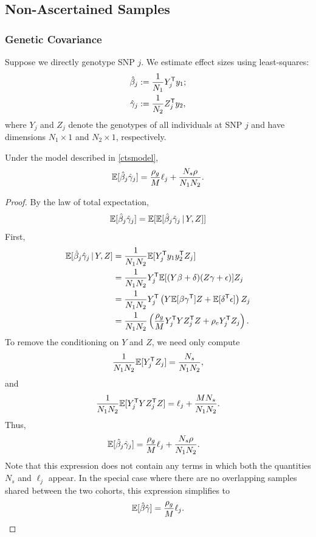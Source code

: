 \documentclass[11pt]{article}
\numberwithin{equation}{section}
\numberwithin{definition}{section}
\numberwithin{thm}{section}
\numberwithin{lemma}{section}
\numberwithin{prop}{section}
\numberwithin{cor}{section}
\numberwithin{hyp}{section}
\begin{document}
\subsection{Non-Ascertained Samples}
\subsubsection{Genetic Covariance}
\label{supp_condexp_qt}
Suppose we directly genotype SNP $j$. 
We estimate effect sizes using least-squares: 
\begin{align*}
	\hat{\beta}_j &:= \frac{1}{N_1}Y^{\mathsf{T}}_jy_1;\\
	\hat{\gamma}_j &:= \frac{1}{N_2}Z^{\mathsf{T}}_jy_2,
\end{align*}
where $Y_j$ and $Z_j$ denote the genotypes of all individuals at SNP $j$ 
and have dimensions $N_1\times 1$ and $N_2\times 1$, respectively.

\begin{prop} 
Under the model described in \ref{ctsmodel}, 
\begin{equation}
	\mathbb{E}[\hat{\beta}_j\hat{\gamma}_j] = \frac{\rho_g}{M}\ell_j  + \frac{N_s\rho}{N_1N_2}.
\end{equation}
\end{prop}

\begin{proof} By the law of total expectation, 
$$\mathbb{E}[\hat{\beta}_j\hat{\gamma}_j] = \mathbb{E}[ \mathbb{E}[\hat{\beta}_j\hat{\gamma}_j \,|\, Y, Z ] ]$$
\noindent
First,
\begin{align*}
	\mathbb{E}[\hat{\beta}_j\hat{\gamma}_j\,|\,Y,Z] &= \frac{1}{N_1N_2}\mathbb{E}[Y^{\mathsf{T}}_jy_1y_2^{\mathsf{T}}Z_j]   \\
       		&= \frac{1}{N_1N_2}Y^{\mathsf{T}}_j\mathbb{E}[{(Y\beta+\delta)}(Z\gamma+\epsilon)]Z_j\\
        		&= \frac{1}{N_1N_2}Y^{\mathsf{T}}_j\left(Y\mathbb{E}[\beta\gamma^{\mathsf{T}}]Z + \mathbb{E}[\delta^{\mathsf{T}}\epsilon]\right)Z_j\\
        		&= \frac{1}{N_1N_2}\left( \frac{\rho_g}{M} Y^{\mathsf{T}}_jYZ^{\mathsf{T}}_jZ  + \rho_eY^{\mathsf{T}}_jZ_j  \right).
\end{align*}
\noindent
To remove the conditioning on $Y$ and $Z$, we need only compute 
$$\frac{1}{N_1N_2}\mathbb{E}[Y^{\mathsf{T}}_jZ_j ] = \frac{N_s}{N_1N_2},$$ 
and 
$$\frac{1}{N_1N_2}\mathbb{E}[Y^{\mathsf{T}}_jYZ^{\mathsf{T}}_jZ] = \ell_j + \frac{MN_s}{N_1N_2}.$$
Thus, 
\begin{align*}
    \mathbb{E}[\hat{\beta}_j\hat{\gamma}_j] &= \frac{\rho_g}{M}\ell_j  + \frac{N_s\rho}{N_1N_2}.
\end{align*}
Note that this expression does not contain any terms in which both the quantities $N_s$ and $\ell_j$ appear. 
In the special case where there are no overlapping samples shared between the two cohorts, this expression simplifies to 
\begin{equation*}
	\mathbb{E}[\hat{\beta}\hat{\gamma}] = \frac{\rho_g}{M}\ell_j.
\end{equation*}
\end{proof}
\end{document}

